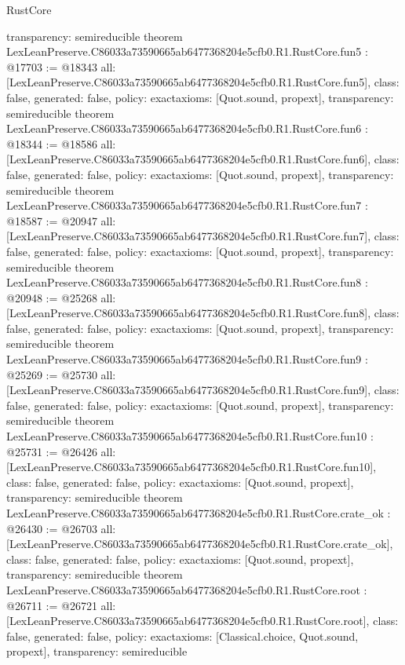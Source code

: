 \begin{lexlean}{RustCore}
\begin{coremodule}
{  transparency: semireducible
}
theorem LexLeanPreserve.C86033a73590665ab6477368204e5cfb0.R1.RustCore.fun5 : @17703 := @18343 {
  all: [LexLeanPreserve.C86033a73590665ab6477368204e5cfb0.R1.RustCore.fun5],
  class: false,
  generated: false,
  policy: exact{axioms: [Quot.sound, propext]},
  transparency: semireducible
}
theorem LexLeanPreserve.C86033a73590665ab6477368204e5cfb0.R1.RustCore.fun6 : @18344 := @18586 {
  all: [LexLeanPreserve.C86033a73590665ab6477368204e5cfb0.R1.RustCore.fun6],
  class: false,
  generated: false,
  policy: exact{axioms: [Quot.sound, propext]},
  transparency: semireducible
}
theorem LexLeanPreserve.C86033a73590665ab6477368204e5cfb0.R1.RustCore.fun7 : @18587 := @20947 {
  all: [LexLeanPreserve.C86033a73590665ab6477368204e5cfb0.R1.RustCore.fun7],
  class: false,
  generated: false,
  policy: exact{axioms: [Quot.sound, propext]},
  transparency: semireducible
}
theorem LexLeanPreserve.C86033a73590665ab6477368204e5cfb0.R1.RustCore.fun8 : @20948 := @25268 {
  all: [LexLeanPreserve.C86033a73590665ab6477368204e5cfb0.R1.RustCore.fun8],
  class: false,
  generated: false,
  policy: exact{axioms: [Quot.sound, propext]},
  transparency: semireducible
}
theorem LexLeanPreserve.C86033a73590665ab6477368204e5cfb0.R1.RustCore.fun9 : @25269 := @25730 {
  all: [LexLeanPreserve.C86033a73590665ab6477368204e5cfb0.R1.RustCore.fun9],
  class: false,
  generated: false,
  policy: exact{axioms: [Quot.sound, propext]},
  transparency: semireducible
}
theorem LexLeanPreserve.C86033a73590665ab6477368204e5cfb0.R1.RustCore.fun10 : @25731 := @26426 {
  all: [LexLeanPreserve.C86033a73590665ab6477368204e5cfb0.R1.RustCore.fun10],
  class: false,
  generated: false,
  policy: exact{axioms: [Quot.sound, propext]},
  transparency: semireducible
}
theorem LexLeanPreserve.C86033a73590665ab6477368204e5cfb0.R1.RustCore.crate_ok : @26430 := @26703 {
  all: [LexLeanPreserve.C86033a73590665ab6477368204e5cfb0.R1.RustCore.crate_ok],
  class: false,
  generated: false,
  policy: exact{axioms: [Quot.sound, propext]},
  transparency: semireducible
}
theorem LexLeanPreserve.C86033a73590665ab6477368204e5cfb0.R1.RustCore.root : @26711 := @26721 {
  all: [LexLeanPreserve.C86033a73590665ab6477368204e5cfb0.R1.RustCore.root],
  class: false,
  generated: false,
  policy: exact{axioms: [Classical.choice, Quot.sound, propext]},
  transparency: semireducible
}


\end{coremodule}
\end{lexlean}
